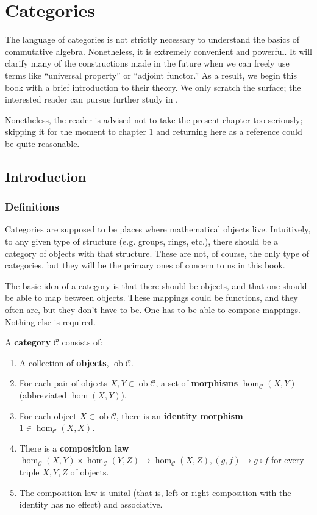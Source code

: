\setcounter{chapter}{-1}
\chapter{Categories}
\label{categorychapter}


The language of categories is not strictly necessary to understand the basics
of  commutative
algebra. Nonetheless, it is extremely convenient and powerful. It will clarify
many of the constructions made in the future when we can freely use terms like
``universal property'' or ``adjoint functor.'' As a result, we begin this book
with a brief introduction to their theory. We only scratch the surface; the
interested reader can pursue further study in \cite{Ma98}.


Nonetheless, the reader is advised not to take the present chapter too
seriously; skipping it for the moment to chapter 1 and returning here as a
reference could be quite reasonable.

\section{Introduction}
\newcommand{\ob}{\operatorname{ob}}

\subsection{Definitions}

Categories are supposed to be places where mathematical objects live.
Intuitively, to any given type of structure (e.g. groups, rings, etc.),
there should be a
category of objects with that structure. These are not, of course, the only
type of categories, but they will be the primary ones of concern to us in this
book.


The basic idea of a category is that there should be objects, and that one
should be able to map between objects. These mappings could be functions, and
they often are, but they don't have to be. One has to be able to compose
mappings. Nothing else is required.

\begin{definition}
A \textbf{category} $\mathcal{C}$ consists of:
\begin{enumerate}
\item  A collection of \textbf{objects},
$\ob \mathcal{C}$.
\item For each pair of objects $X, Y \in
\ob \mathcal{C}$, a set
of \textbf{morphisms} $\hom_{\mathcal{C}}(X, Y)$ (abbreviated $\hom(X,Y)$).
\item For each object $X \in \ob\mathcal{C}$, there is an \textbf{identity
morphism}
$1 \in \hom_{\mathcal{C}}(X, X)$.
\item There is a \textbf{composition law}
$\hom_{\mathcal{C}}(X, Y) \times \hom_{\mathcal{C}}(Y, Z) \to
\hom_{\mathcal{C}}(X, Z), (g, f) \to g
\circ f$ for every
triple $X, Y, Z$ of objects.
\item  The composition law is unital (that is, left or right composition with
the identity has no effect) and associative.
\end{enumerate}
\end{definition}

